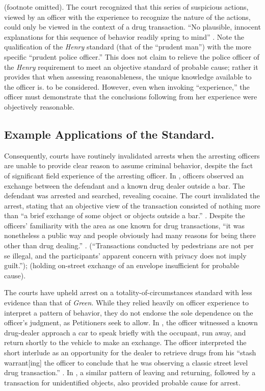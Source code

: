 \documentclass[12pt]{lawmemo}
\begin{document}
\noindent {} (footnote omitted).  The court recognized
that this series of suspicious actions, viewed by an officer with the
experience to recognize the nature of the actions, could only be viewed in the
context of a drug transaction.   ``No plausible, innocent explanations for this
sequence of behavior readily spring to mind\ldotss'' .
Note the qualification of the \textit{Henry} standard (that of the ``prudent
man'') with the more specific ``prudent police officer.'' This does not claim
to relieve the police officer of the \textit{Henry} requirement to meet an
objective standard of probable cause; rather it provides that when assessing
reasonableness, the unique knowledge available to the officer is.  to be
considered.  However, even when invoking ``experience,'' the officer must
demonstrate that the conclusions following from her experience were objectively
reasonable. 

\subsection{Example Applications of the Standard.} Consequently, courts have routinely
invalidated arrests when the arresting officers are unable to provide clear
reason to assume criminal behavior, despite the fact of significant field
experience of the arresting officer.  In \cite{Ratcliff}, officers observed
an exchange between the defendant and a known drug dealer outside a bar.  The
defendant was arrested and searched, revealing cocaine.   The court invalidated
the arrest, stating that an objective view of the transaction consisted of
nothing more than ``a brief exchange of some object or objects outside a bar.''
.  Despite the officers' familiarity with the area as
one known for drug transactions, ``it was nonetheless a public way and people
obviously had many reasons for being there other than drug dealing.''
.  \Seealso {}
(``Transactions conducted by pedestrians are not per se illegal, and the
participants' apparent concern with privacy does not imply guilt.'');
\cite{Oden} (holding on-street exchange of an envelope insufficient 
for probable cause). 

The courts have upheld arrest on a totality-of-circumstances standard with less
evidence than that of \textit{Green}.  While they relied heavily on officer
experience to interpret a pattern of behavior, they do not endorse the sole
dependence on the officer's judgment, as Petitioners seek to allow.  In
\cite{Kennedy}, the officer witnessed a known drug-dealer approach a car to
speak briefly with the occupant, run away, and return shortly to the vehicle to
make an exchange.  The officer interpreted the short interlude as an
opportunity for the dealer to retrieve drugs from his ``stash\ldotss
warrant[ing] the officer to conclude that he was observing a classic street
level drug transaction.'' .  In \cite{Moore}, a
similar pattern of leaving and returning, followed by a transaction for
unidentified objects, also provided probable cause for arrest.
\end{document}
